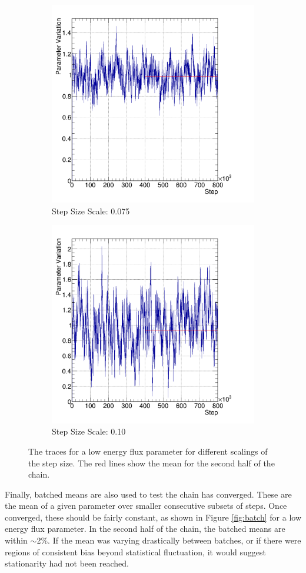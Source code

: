 \begin{figure}
\begin{subfigure}{.5\textwidth}
  \includegraphics[width=0.73\linewidth]{figs/trace2}
  \caption{Step Size Scale: 0.075}
  \label{fig:trace2}
\end{subfigure}%
\begin{subfigure}{.5\textwidth}
  \centering
  \includegraphics[width=0.73\linewidth]{figs/trace3}
  \caption{Step Size Scale: 0.10}
  \label{fig:trace3}
\end{subfigure}
\caption{The traces for a low energy flux parameter for different scalings of the step size. The red lines show the mean for the second half of the chain.}
\label{fig:traces}
\end{figure}

Finally, batched means are also used to test the chain has converged. These are the mean of a given parameter over smaller consecutive subsets of steps. Once converged, these should be fairly constant, as shown in Figure \ref{fig:batch} for a low energy flux parameter. In the second half of the chain, the batched means are within $\sim$2$\%$. If the mean was varying drastically between batches, or if there were regions of consistent bias beyond statistical fluctuation, it would suggest stationarity had not been reached.


